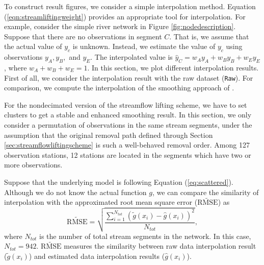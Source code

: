 \documentclass[11pt,titlepage]{article}
\begin{document}
To construct result figures, we consider a simple interpolation method. Equation (\ref{eqn:streamliftingweight}) provides an appropriate tool for interpolation. For example, consider the simple river network in Figure \ref{fig:nodedescription}. Suppose that there are no observations in segment $C$. That is, we assume that the actual value of $y_c$ is unknown. Instead, we estimate the value of $y_c$ using observations $y_A, y_B,$ and $y_E$. The interpolated value is $\hat{y}_{C} = w_{A}y_A + w_{B}y_B + w_{E}y_E$, where $w_{A} + w_{B} + w_{E} = 1$.
In this section, we plot different interpolation results. First of all, we consider the interpolation result with the raw dataset (\texttt{Raw}). For comparison, we compute the interpolation of the smoothing approach of \cite{ODonnell2014}. 

For the nondecimated version of the streamflow lifting scheme, we have to set clusters to get a stable and enhanced smoothing result. In this section, we only consider a permutation of observations in the same stream segments, under the assumption that the original removal path defined through Section \ref{sec:streamflowliftingscheme} is such a well-behaved removal order. Among 127 observation stations, 12 stations are located in the segments which have two or more observations. 

Suppose that the underlying model is following Equation (\ref{eq:scattered}). Although we do not know the actual function $g$, we can compare the similarity of interpolation with the approximated root mean square error ($\widetilde{\text{RMSE}}$) as 
\[
\widetilde{\text{RMSE}}=\sqrt{\frac{\sum_{i=1}^{N_{tot}} (\tilde{g}(x_i)-\hat{g}(x_i))^{2}} {N_{tot}}},
\]
where $N_{tot}$ is the number of total stream segments in the network. In this case, $N_{tot}=942$. $\widetilde{\text{RMSE}}$ measures the similarity between raw data interpolation result ($\tilde{g}(x_i)$) and estimated data interpolation results ($\hat{g}(x_i)$).
\end{document}
